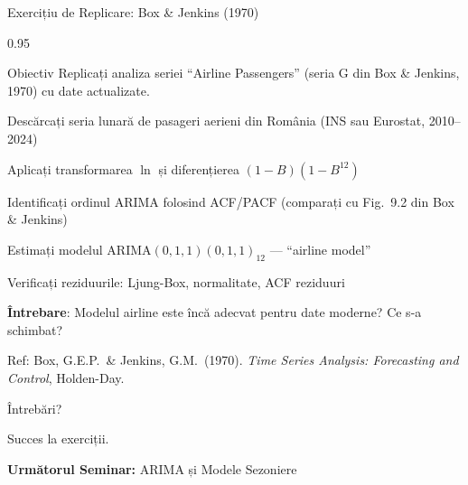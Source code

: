 \documentclass[9pt, aspectratio=169, t]{beamer}
\begin{document}
\begin{frame}{Exercițiu de Replicare: Box \& Jenkins (1970)}
    \begin{cminipage}{0.95\textwidth}
        \begin{block}{Obiectiv}
            Replicați analiza seriei ``Airline Passengers'' (seria G din Box \& Jenkins, 1970) cu date actualizate.
        \end{block}
        \begin{enumerate}\setlength{\itemsep}{2pt}
            {\small
            \item Descărcați seria lunară de pasageri aerieni din România (INS sau Eurostat, 2010--2024)
            \item Aplicați transformarea $\ln$ și diferențierea $(1-B)(1-B^{12})$
            \item Identificați ordinul ARIMA folosind ACF/PACF (comparați cu Fig.\ 9.2 din Box \& Jenkins)
            \item Estimați modelul ARIMA$(0,1,1)(0,1,1)_{12}$ --- ``airline model''
            \item Verificați reziduurile: Ljung-Box, normalitate, ACF reziduuri
            \item \textbf{Întrebare}: Modelul airline este încă adecvat pentru date moderne? Ce s-a schimbat?
            }
        \end{enumerate}
        {\tiny Ref: Box, G.E.P.\ \& Jenkins, G.M.\ (1970). \textit{Time Series Analysis: Forecasting and Control}, Holden-Day.}
    \end{cminipage}
\end{frame}

\begin{frame}{}
    \centering
    \vspace{2cm}
    {\Huge\textcolor{MainBlue}{Întrebări?}}

    \vspace{1cm}

    \normalsize
    Succes la exerciții.

    \vspace{0.5cm}

    \textbf{Următorul Seminar:} ARIMA și Modele Sezoniere
\end{frame}
\end{document}
